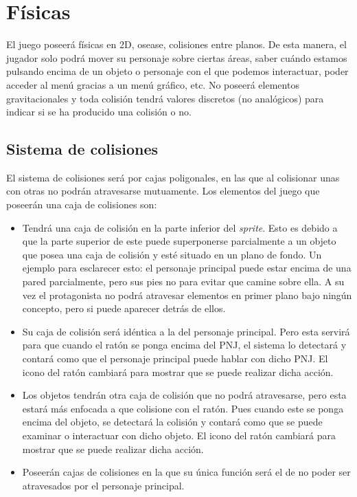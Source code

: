 	    \section{Físicas}
	    El juego poseerá físicas en 2D, osease, colisiones entre planos. De esta manera, el jugador solo podrá mover su personaje sobre ciertas áreas, saber cuándo estamos pulsando encima de un objeto o personaje con el que podemos interactuar, poder acceder al menú gracias a un menú gráfico, etc. No poseerá elementos gravitacionales y toda colisión tendrá valores discretos (no analógicos) para indicar si se ha producido una colisión o no.
	    
	    	\subsection{Sistema de colisiones}
	    	El sistema de colisiones será por cajas poligonales, en las que al colisionar unas con otras no podrán atravesarse mutuamente. Los elementos del juego que poseerán una caja de colisiones son:
	    	
	    	\begin{itemize}
	    	\item {} Tendrá una caja de colisión en la parte inferior del \emph{sprite}. Esto es debido a que la parte superior de este puede superponerse parcialmente a un objeto que posea una caja de colisión y esté situado en un plano de fondo. Un ejemplo para esclarecer esto: el personaje principal puede estar encima de una pared parcialmente, pero sus pies no para evitar que camine sobre ella. A su vez el protagonista no podrá atravesar elementos en primer plano bajo ningún concepto, pero si puede aparecer detrás de ellos.
	    	\item {} Su caja de colisión será idéntica a la del personaje principal. Pero esta servirá para que cuando el ratón se ponga encima del PNJ, el sistema lo detectará y contará como que el personaje principal puede hablar con dicho PNJ. El icono del ratón cambiará para mostrar que se puede realizar dicha acción.
	    	\item {} Los objetos tendrán otra caja de colisión que no podrá atravesarse, pero esta estará más enfocada a que colisione con el ratón. Pues cuando este se ponga encima del objeto, se detectará la colisión y contará como que se puede examinar o interactuar con dicho objeto. El icono del ratón cambiará para mostrar que se puede realizar dicha acción.
	    	\item {} Poseerán cajas de colisiones en la que su única función será el de no poder ser atravesados por el personaje principal. 
	    	\end{itemize}